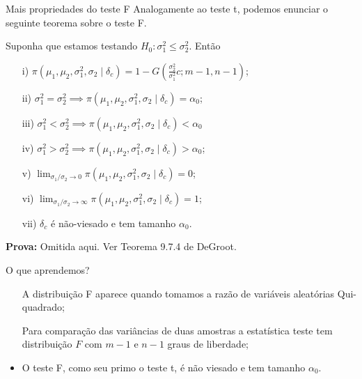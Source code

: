   \begin{frame}{Mais propriedades do teste F}
 Analogamente ao teste t, podemos enunciar o seguinte teorema sobre o teste F.
 \begin{theo}
 Suponha que estamos testando $H_0: \sigma_1^2 \leq \sigma_2^2$.
 Então
 \begin{itemize}
 \item [i)] $\pi(\mu_1, \mu_2, \sigma_1^2, \sigma_2 \mid \delta_c) = 1 -G\left(\frac{\sigma_2^2}{\sigma_1^2}c; m-1, n-1\right)$;
 \item [ii)] $\sigma_1^2 = \sigma_2^2 \implies \pi(\mu_1, \mu_2, \sigma_1^2, \sigma_2 \mid \delta_c) = \alpha_0$;
 \item [iii)] $\sigma_1^2 < \sigma_2^2 \implies \pi(\mu_1, \mu_2, \sigma_1^2, \sigma_2 \mid \delta_c) < \alpha_0$
 \item [iv)] $\sigma_1^2 > \sigma_2^2 \implies \pi(\mu_1, \mu_2, \sigma_1^2, \sigma_2 \mid \delta_c) > \alpha_0$;
 \item [v)] $\lim_{\sigma_1/\sigma_2 \to 0} \pi(\mu_1, \mu_2, \sigma_1^2, \sigma_2 \mid \delta_c) = 0$;
 \item [vi)] $\lim_{\sigma_1/\sigma_2 \to \infty} \pi(\mu_1, \mu_2, \sigma_1^2, \sigma_2 \mid \delta_c) = 1$;
 \item[vii)] $\delta_c$ é não-viesado e tem tamanho $\alpha_0$.
\end{itemize}
\end{theo}
\textbf{Prova:} Omitida aqui. 
Ver Teorema 9.7.4 de DeGroot.  
 \end{frame}
 
\begin{frame}{O que aprendemos?}
\begin{itemize}
  \item[\faLightbulbO] A distribuição F aparece quando tomamos a razão de variáveis aleatórias Qui-quadrado;    
  \item[\faLightbulbO] Para comparação das variâncias de duas amostras a estatística teste tem distribuição $F$ com $m-1$ e $n-1$ graus de liberdade; 
  \item O teste F, como seu primo o teste t, é não viesado e tem tamanho $\alpha_0$.
   \end{itemize}
 \end{frame} 
 
